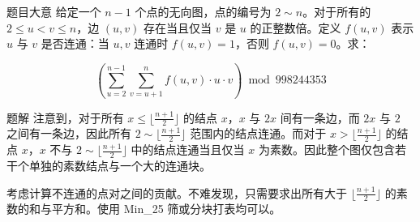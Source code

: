 \begin{frame}{题目大意}
	给定一个 $n - 1$ 个点的无向图，点的编号为 $2 \sim n$。对于所有的 $2 \le u < v \le n$，边 $(u, v)$ 存在当且仅当 $v$ 是 $u$ 的正整数倍。定义 $f(u, v)$ 表示 $u$ 与 $v$ 是否连通：当 $u, v$ 连通时 $f(u, v) = 1$，否则 $f(u, v) = 0$。求：

	$$\left(\sum_{u = 2} ^ {n - 1} \sum_{v = u + 1} ^ n f(u, v) \cdot u \cdot v\right) \bmod {998244353}$$

\end{frame}

\begin{frame}{题解}
注意到，对于所有 $x \le \lfloor \frac{n + 1}{2} \rfloor$ 的结点 $x$，$x$ 与 $2x$ 间有一条边，而 $2x$ 与 $2$ 之间有一条边，因此所有 $2 \sim \lfloor \frac{n + 1}{2} \rfloor$ 范围内的结点连通。而对于 $x > \lfloor \frac{n + 1}{2} \rfloor$ 的结点 $x$，$x$ 不与 $2 \sim \lfloor \frac{n + 1}{2} \rfloor$ 中的结点连通当且仅当 $x$ 为素数。因此整个图仅包含若干个单独的素数结点与一个大的连通块。\pause

考虑计算不连通的点对之间的贡献。不难发现，只需要求出所有大于 $ \lfloor \frac{n + 1}{2} \rfloor$ 的素数的和与平方和。使用 Min\_25 筛或分块打表均可以。

\end{frame}
